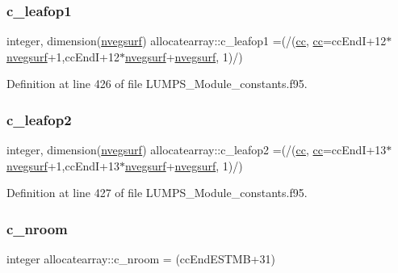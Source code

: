 \subsubsection{\texorpdfstring{c\+\_\+leafop1}{c\_leafop1}}
{\footnotesize\ttfamily integer, dimension(\hyperlink{namespaceallocatearray_abb987c3b35dd321963fd53d38f10236f}{nvegsurf}) allocatearray\+::c\+\_\+leafop1 =(/(\hyperlink{namespaceallocatearray_ac863c81704eb507dee10f5e10741e10c}{cc}, \hyperlink{namespaceallocatearray_ac863c81704eb507dee10f5e10741e10c}{cc}=cc\+EndI+12$\ast$\hyperlink{namespaceallocatearray_abb987c3b35dd321963fd53d38f10236f}{nvegsurf}+1,cc\+EndI+12$\ast$\hyperlink{namespaceallocatearray_abb987c3b35dd321963fd53d38f10236f}{nvegsurf}+\hyperlink{namespaceallocatearray_abb987c3b35dd321963fd53d38f10236f}{nvegsurf}, 1)/)}



Definition at line 426 of file L\+U\+M\+P\+S\+\_\+\+Module\+\_\+constants.\+f95.

\mbox{\label{namespaceallocatearray_af3a3b26a0669c8172211b1f09b34e9fa}} 
\subsubsection{\texorpdfstring{c\+\_\+leafop2}{c\_leafop2}}
{\footnotesize\ttfamily integer, dimension(\hyperlink{namespaceallocatearray_abb987c3b35dd321963fd53d38f10236f}{nvegsurf}) allocatearray\+::c\+\_\+leafop2 =(/(\hyperlink{namespaceallocatearray_ac863c81704eb507dee10f5e10741e10c}{cc}, \hyperlink{namespaceallocatearray_ac863c81704eb507dee10f5e10741e10c}{cc}=cc\+EndI+13$\ast$\hyperlink{namespaceallocatearray_abb987c3b35dd321963fd53d38f10236f}{nvegsurf}+1,cc\+EndI+13$\ast$\hyperlink{namespaceallocatearray_abb987c3b35dd321963fd53d38f10236f}{nvegsurf}+\hyperlink{namespaceallocatearray_abb987c3b35dd321963fd53d38f10236f}{nvegsurf}, 1)/)}



Definition at line 427 of file L\+U\+M\+P\+S\+\_\+\+Module\+\_\+constants.\+f95.

\mbox{\label{namespaceallocatearray_a40863099afa066fca952f172e733261c}} 
\subsubsection{\texorpdfstring{c\+\_\+nroom}{c\_nroom}}
{\footnotesize\ttfamily integer allocatearray\+::c\+\_\+nroom = (cc\+End\+E\+S\+T\+MB+31)}



